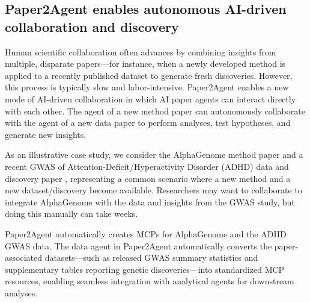 \documentclass[11pt]{article}
\begin{document}
\subsection*{Paper2Agent enables autonomous AI-driven collaboration and discovery}

Human scientific collaboration often advances by combining insights from multiple, disparate papers—for instance, when a newly developed method is applied to a recently published dataset to generate fresh discoveries. However, this process is typically slow and labor-intensive. Paper2Agent enables a new mode of AI-driven collaboration in which AI paper agents can interact directly with each other. The agent of a new method paper can autonomously collaborate with the agent of a new data paper to perform analyses, test hypotheses, and generate new insights.


As an illustrative case study, we consider the AlphaGenome method paper \citep{avsec2025alphagenome} and a recent GWAS of Attention-Deficit/Hyperactivity Disorder (ADHD) data and discovery paper \citep{van2025genome}, representing a common scenario where a new method and a new dataset/discovery become available. Researchers may want to collaborate to integrate AlphaGenome with the data and insights from the GWAS study, but doing this manually can take weeks. 

 Paper2Agent automatically creates MCPs for AlphaGenome and the ADHD GWAS data. The data agent in Paper2Agent automatically converts the paper-associated datasets—such as released GWAS summary statistics and supplementary tables reporting genetic discoveries—into standardized MCP resources, enabling seamless integration with analytical agents for downstream analyses. 
 
\end{document}
